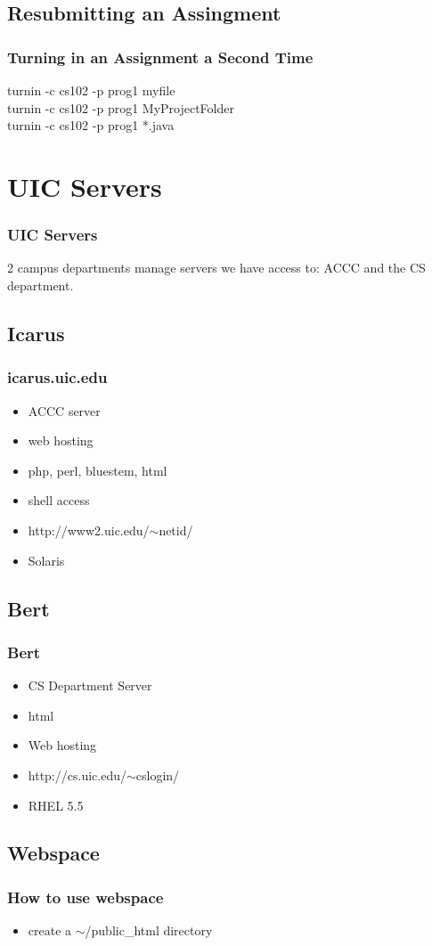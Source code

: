 \documentclass[hyperref={pdfpagelabels=false}]{beamer}
\begin{document}
\subsection{Resubmitting an Assingment}
\frame
{
    \frametitle{Turning in an Assignment a Second Time}
	turnin -c cs102 -p prog1 myfile\\
	turnin -c cs102 -p prog1 MyProjectFolder\\
	turnin -c cs102 -p prog1 *.java\\
	
}
\section{UIC Servers}
\frame
{
    \frametitle{UIC Servers}
    2 campus departments manage servers we have access to: ACCC and the CS department.
}
\subsection{Icarus}
\frame
{
    \frametitle{icarus.uic.edu}
    \begin{itemize}
    \item{ACCC server}
    \item{web hosting}
    \item{php, perl, bluestem, html}
    \item{shell access}
    \item{http://www2.uic.edu/$\sim$netid/}
    \item{Solaris}
    \end{itemize}
}
\subsection{Bert}
\frame
{
    \frametitle{Bert}
    \begin{itemize}
    \item{CS Department Server}
    \item{html}
    \item{Web hosting}
    \item{http://cs.uic.edu/$\sim$cslogin/}
    \item{RHEL 5.5}
    \end{itemize}
}
\subsection{Webspace}
\frame
{
    \frametitle{How to use webspace}
    \begin{itemize}
    \item{create a $\sim$/public\_html directory}
    \end{itemize}
}
\end{document}
